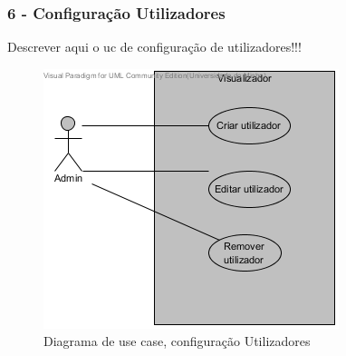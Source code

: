 \subsubsection{\textbf{6 - Configuração Utilizadores}}

Descrever aqui o uc de configuração de utilizadores!!!

\begin{figure}[!htb]
	\centering
	\includegraphics[scale=0.80]{images/ucs/ConfUtilizadores}
	\caption {Diagrama de use case, configuração Utilizadores}
\end{figure}
\pagebreak

